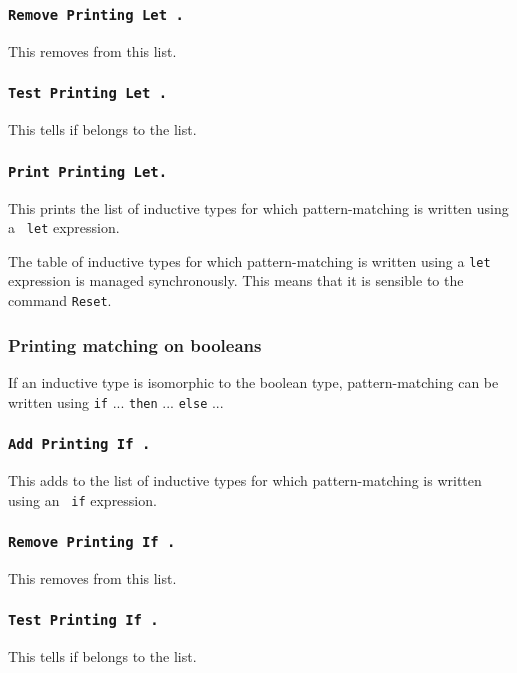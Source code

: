 {\begin{coq_example}
\subsubsection{\tt Remove Printing Let {\ident}.}
This removes {\ident} from this list.

\subsubsection{\tt Test Printing Let {\ident}.}
This tells if {\ident} belongs
to the list.

\subsubsection{\tt Print Printing Let.}
This prints the list of inductive types
for which pattern-matching is written using a {\tt
let} expression.

The table of inductive types for which pattern-matching is written
using a {\tt let} expression is managed synchronously. This means that
it is sensible to the command {\tt Reset}.


\subsubsection{Printing matching on booleans}

If an inductive type is isomorphic to the boolean type,
pattern-matching can be written using {\tt if} ... {\tt then}
... {\tt else} ...

\subsubsection{\tt Add Printing If {\ident}.}
This adds {\ident} to the list
of inductive types for which pattern-matching is written using an {\tt
if} expression.

\subsubsection{\tt Remove Printing If {\ident}.}
This removes {\ident} from this list.

\subsubsection{\tt Test Printing If {\ident}.}
This tells if {\ident} belongs
to the list.


\end{coq_example}}
